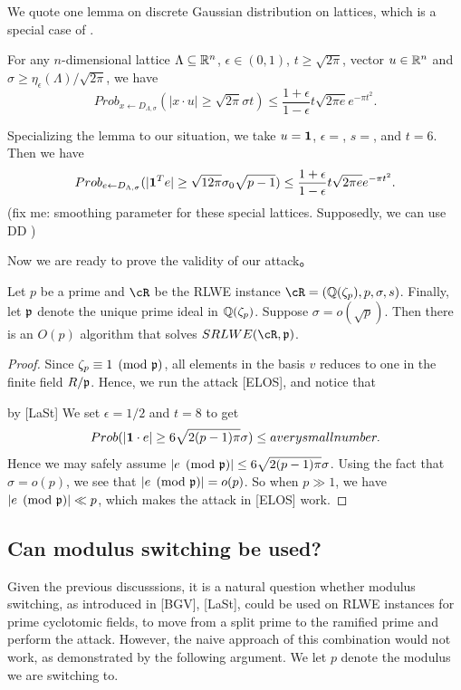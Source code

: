 \documentclass{amsart}
\begin{document}
We quote one lemma on discrete Gaussian distribution on lattices, which is a special case of  \cite[Lemma 8]{langlois2014worst}.
\begin{Lemma}
For any $n$-dimensional lattice $\Lambda \subseteq \mathbb{R}^n$, $\epsilon \in (0,1)$, $t \geq \sqrt{2 \pi}$, vector $u \in \mathbb{R}^n$ and $\sigma \geq \eta_\epsilon(\Lambda)/\sqrt{2 \pi}$, we have
\[
    Prob_{x \gets D_{\Lambda,\sigma}}(|x \cdot u| \geq \sqrt{2 \pi}\sigma t) \leq \frac{1+\epsilon}{1-\epsilon} t \sqrt{2 \pi e} e^{- \pi t^2}.
\]
\end{Lemma}

Specializing the lemma to our situation, we take $u = {\bf 1}$, $\epsilon = $, $s = $, and $t = 6$. Then we have
\[
    Prob_{e \gets D_{\Lambda,\sigma}}( |{\bf 1}^T e| \geq \sqrt{12 \pi}\sigma_0 \sqrt{p-1}) \leq \frac{1+\epsilon}{1-\epsilon} t \sqrt{2 \pi e} e^{- \pi t^2}.
\]
(fix me: smoothing parameter for these special lattices. Supposedly, we can use DD )

Now we are ready to prove the validity of our attack。
\begin{theorem}
Let $p$ be a prime and $\cR$ be the RLWE instance $\cR = (\bQ(\zeta_p), p,\sigma,s)$. Finally, let $\mathfrak{p}$ denote the unique prime ideal in $\mathbb{Q}(\zeta_p)$. Suppose $\sigma = o(\sqrt{p})$. Then there is an $O(p)$ algorithm that solves $SRLWE(\cR,\fp)$.
\end{theorem}

\begin{proof}
Since $\zeta_p \equiv 1 \pmod{\mathfrak{p}}$, all elements in the basis $v$ reduces to one in the finite field $R/\mathfrak{p}$. Hence, we run the attack [ELOS], and notice that

by [LaSt] We set $\epsilon = 1/2$ and $t  = 8$ to get
\[
Prob(|{\bf 1} \cdot e| \geq 6\sqrt{2(p-1)\pi} \sigma) \leq a very small number.
\]
Hence we may safely assume
$|e \pmod{\mathfrak{p}}|\leq 6\sqrt{2(p-1)\pi} \sigma$. Using the fact that $\sigma = o(p)$, we see that $|e \pmod{\mathfrak{p}}| = o(p)$. So when $p \gg 1$, we have  $|e \pmod{\mathfrak{p}}| \ll p$, which makes the attack in [ELOS] work.
\end{proof}

\subsection{Can modulus switching be used?}

Given the previous discusssions, it is a natural question whether modulus switching, as introduced in [BGV], [LaSt],
could be used on RLWE instances for prime cyclotomic fields, to move from a split prime to the ramified prime and perform the attack. However, the naive approach of this combination would not work, as demonstrated by the following argument.
We let $p$ denote the modulus we are switching to.
\end{document}
